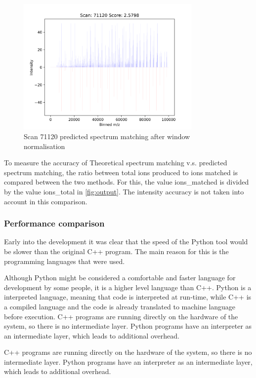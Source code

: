 \documentclass[11pt]{article}
\begin{document}
\begin{figure}[ht]
\centering
\includegraphics[width=0.8\textwidth]{figs/scan_71120_ps=True_wins.png}
\caption{Scan 71120 predicted spectrum matching after window normalisation}
\label{fig:scanwin}
\end{figure}

To measure the accuracy of Theoretical spectrum matching v.s. predicted spectrum matching, the ratio between total ions produced to ions matched is compared between the two methods. For this, the value ions\_matched is divided by the value ions\_total in \cref{fig:output}. The intensity accuracy is not taken into account in this comparison.

\subsubsection{Performance comparison}
Early into the development it was clear that the speed of the Python tool would be slower than the original C++ program. The main reason for this is the programming languages that were used. 

Although Python might be considered a comfortable and faster language for development by some people, it is a higher level language than C++. Python is a interpreted language, meaning that code is interpreted at run-time, while C++ is a compiled language and the code is already translated to machine language before execution. C++ programs are running directly on the hardware of the system, so there is no intermediate layer. Python programs have an interpreter as an intermediate layer, which leads to additional overhead.

C++ programs are running directly on the hardware of the system, so there is no intermediate layer. Python programs have an interpreter as an intermediate layer, which leads to additional overhead.
\end{document}
